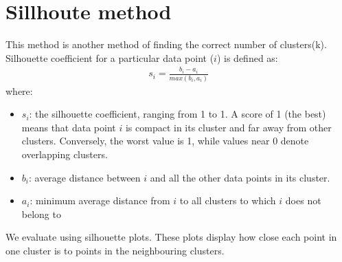 \documentclass[letterpaper,10pt,english]{jupyterBook}
\begin{document}
\section{Sillhoute method}
\label{\detokenize{Clustering_Analysis:sillhoute-method}}
\sphinxAtStartPar
This method is another method of finding the correct number of clusters(k). Silhouette coefficient for a particular data point (\(i\)) is defined as:
\begin{equation*}
\begin{split}
s_{i} = \frac{b_{i} - a_{i}}{max(b_{i}, a_{i})}
\end{split}
\end{equation*}
\sphinxAtStartPar
where:
\begin{itemize}
\item {} 
\sphinxAtStartPar
\(s_{i}\): the silhouette coefficient, ranging from \sphinxhyphen{}1 to 1. A score of 1 (the best) means that data point \(i\) is compact in its cluster and far away from other clusters. Conversely, the worst value is \sphinxhyphen{}1, while values near 0 denote overlapping clusters.

\item {} 
\sphinxAtStartPar
\(b_{i}\): average distance between \(i\) and all the other data points in its cluster.

\item {} 
\sphinxAtStartPar
\(a_{i}\): minimum average distance from \(i\) to all clusters to which \(i\) does not belong to

\end{itemize}

\sphinxAtStartPar
We evaluate using silhouette plots. These plots display how close each point in one cluster is to points in the neighbouring clusters.
\end{document}
